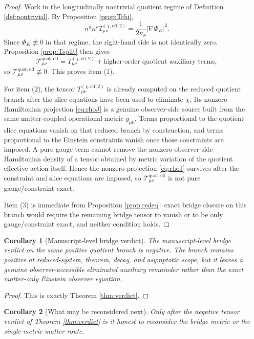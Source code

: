 \documentclass[11pt]{article}
\newcommand{\EffAux}{\mathcal T_{\mu\nu}^{\mathrm{quot,eff}}}
\newtheorem{corollary}{Corollary}
\begin{document}
\begin{proof}
Work in the longitudinally nontrivial quotient regime of Definition \ref{def:nontrivial}. By Proposition \ref{prop:Tchi},
\[
n^\mu n^\nu T_{\mu\nu}^{(\chi,\mathrm{eff},2)}
=
\frac{1}{2\kappa_\theta}|\nabla\Phi_K|^2.
\]
Since \(\Phi_K\not\equiv0\) in that regime, the right-hand side is not identically zero. Proposition \ref{prop:Tsplit} then gives
\[
\EffAux
=
T_{\mu\nu}^{(\chi,\mathrm{eff},2)}
+\text{higher-order quotient auxiliary terms},
\]
so \(\EffAux\not\equiv0\). This proves item (1).

For item (2), the tensor \(T_{\mu\nu}^{(\chi,\mathrm{eff},2)}\) is already computed on the reduced quotient branch after the slice equations have been used to eliminate \(\chi\). Its nonzero Hamiltonian projection \eqref{eq:rhoJ} is a genuine observer-side source built from the same matter-coupled operational metric \(g_{\mu\nu}\). Terms proportional to the quotient slice equations vanish on that reduced branch by construction, and terms proportional to the Einstein constraints vanish once those constraints are imposed. A pure gauge term cannot remove the nonzero observer-side Hamiltonian density of a tensor obtained by metric variation of the quotient effective action itself. Hence the nonzero projection \eqref{eq:rhoJ} survives after the constraint and slice equations are imposed, so \(\EffAux\) is not pure gauge/constraint exact.

Item (3) is immediate from Proposition \ref{prop:redeq}: exact bridge closure on this branch would require the remaining bridge tensor to vanish or to be only gauge/constraint exact, and neither condition holds.
\end{proof}

\begin{corollary}[Manuscript-level bridge verdict]
\label{cor:verdict}
The manuscript-level bridge verdict on the same positive quotient branch is negative. The branch remains positive at reduced-system, theorem, decay, and asymptotic scope, but it leaves a genuine observer-accessible eliminated auxiliary remainder rather than the exact matter-only Einstein observer equation.
\end{corollary}

\begin{proof}
This is exactly Theorem \ref{thm:verdict}.
\end{proof}

\begin{corollary}[What may be reconsidered next]
\label{cor:next}
Only after the negative tensor verdict of Theorem \ref{thm:verdict} is it honest to reconsider the bridge metric or the single-metric matter route.
\end{corollary}
\end{document}
